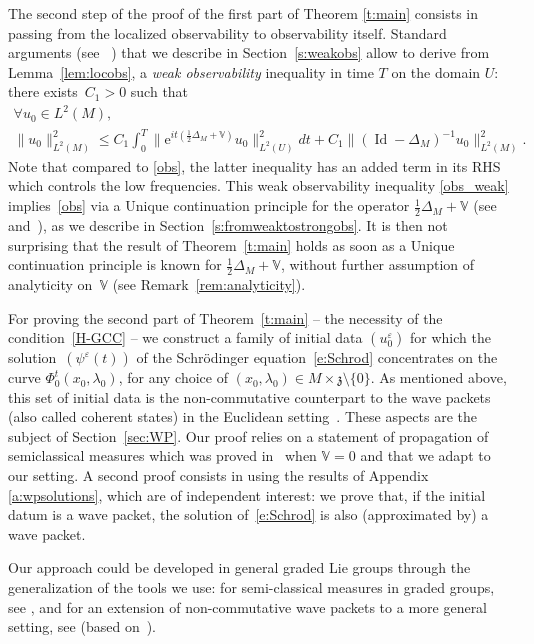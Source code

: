\documentclass[10pt]{amsart}
\newcommand{\rme}{\mathrm{e}}
\DeclareMathOperator{\Id}{Id}
\theoremstyle{plain}
\theoremstyle{definition}
\let\eps\varepsilon
\def\bbV{{\mathbb V}}
\begin{document}
The second step of the proof of the first part of Theorem \ref{t:main} consists in passing from the localized observability to observability itself.
Standard arguments (see ~\cite{BZ}) that we describe in Section~\ref{s:weakobs} allow to derive from Lemma~\ref{lem:locobs}, a \emph{weak observability} inequality in time $T$ on the domain $U$: there exists~$C_1>0$ such that
\begin{multline}\label{obs_weak}
\forall u_0\in L^2(M),\\[-5pt]
\|u_0\|^2_{L^2(M)} \leq C_1 \int_0^T \bigl\| \rme^{it(\frac12 \Delta_M+\bbV)} u_0 \bigr\|^2_{L^2(U)} dt
+ C_1 \| (\Id-\Delta_M)^{-1} u_0\|^2_{L^2(M)}.
\end{multline}
Note that compared to \eqref{obs}, the latter inequality has an added term in its RHS which controls the low frequencies. This weak observability inequality \eqref{obs_weak} implies~\eqref{obs} via a Unique continuation principle for the operator $\frac12\Delta_M+\bbV$ (see~\cite{Bon69} and~\cite{Laur}), as we describe in Section~\ref{s:fromweaktostrongobs}. It is then not surprising that the result of Theorem~\ref{t:main} holds as soon as a Unique continuation principle is known for $\frac12\Delta_M+\bbV$, without further assumption of analyticity on~$\bbV$ (see Remark~\ref{rem:analyticity}).

For proving the second part of Theorem~\ref{t:main} -- the necessity of the condition~\eqref{H-GCC} -- we construct a family of initial data $(u^\eps_0)$ for which the solution~$(\psi^\eps(t))$ of the Schrödinger equation~\eqref{e:Schrod} concentrates on the curve $\Phi^t_0(x_0,\lambda_0)$, for any choice of $(x_0,\lambda_0)\in M\times \mathfrak z\setminus \{0\}$. As mentioned above, this set of initial data is the non-commutative counterpart to the wave packets (also called coherent states) in the Euclidean setting~\cite{CR,hag}. These aspects are the subject of Section~\ref{sec:WP}. Our proof relies on a statement of propagation of semiclassical measures which was proved in~\cite{FF} when $\bbV=0$ and that we adapt to our setting. A second proof consists in using the results of Appendix \ref{a:wpsolutions}, which are of independent interest: we prove that, if the initial datum is a wave packet, the solution of~\eqref{e:Schrod} is also (approximated by) a wave packet.

Our approach
could be developed in general graded Lie groups through the generalization of the tools we use: for semi-classical measures in graded groups, see \cite[Rem.\,3.3 \& 4.4]{FF1}, and for an extension of non-commutative wave packets to a more general setting, see \cite[\S\S6.3 \& 6.4]{FF18} (based on~\cite{pedersen}).
\end{document}
